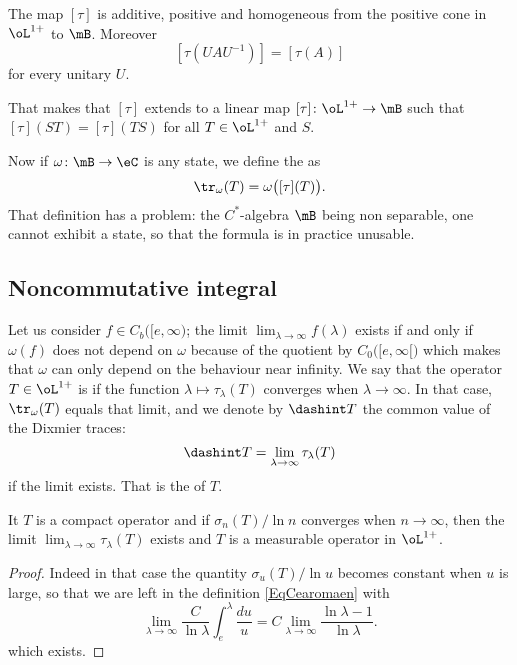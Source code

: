 \begin{proposition}
	The map $[\tau]$ is additive, positive and homogeneous from the positive cone in $\oL^{1+}$ to $\mB$. Moreover
	\[
		[\tau(UAU^{-1})]=[\tau(A)]
	\]
	for every unitary $U$.
\end{proposition}
That makes that $[\tau]$ extends to a linear map $[\tau]\colon \oL^{1+}\to \mB$ such that $[\tau](ST)=[\tau](TS)$ for all $T\in\oL^{1+}$ and $S$.

Now if $\omega\colon \mB\to \eC$ is any state, we define the  as
\begin{equation}
	\tr_{\omega}(T)=\omega\big( [\tau](T) \big).
\end{equation}
That definition has a problem: the $C^*$-algebra $\mB$ being non separable, one cannot exhibit a state, so that the formula is in practice unusable.

\subsection{Noncommutative integral}

Let us consider $f\in C_b\big( [e,\infty \big)$; the limit $\lim_{\lambda\to\infty}f(\lambda)$ exists if and only if $\omega(f)$ does not depend on $\omega$ because of the quotient by $C_0\big( [e,\infty[ \big)$ which makes that $\omega$ can only depend on the behaviour near infinity. We say that the operator $T\in\oL^{1+}$ is  if the function $\lambda\mapsto\tau_{\lambda}(T)$ converges when $\lambda\to\infty$. In that case, $\tr_{\omega}(T)$ equals that limit, and we denote by $\dashint T$ the common value of the Dixmier traces:
\begin{equation}
	\dashint T=\lim_{\lambda\to\infty}\tau_{\lambda}(T)
\end{equation}
if the limit exists. That is the  of $T$.

\begin{proposition}
	It $T$ is a compact operator and if $\sigma_n(T)/\ln n$ converges when $n\to\infty$, then the limit $\lim_{\lambda\to\infty}\tau_{\lambda}(T)$ exists and $T$ is a measurable operator in $\oL^{1+}$.
\end{proposition}

\begin{proof}
	Indeed in that case the quantity $\sigma_u(T)/\ln u$ becomes constant when $u$ is large, so that we are left in the definition \eqref{EqCearomaen} with
	\[
		\lim_{\lambda\to\infty}\frac{C}{ \ln\lambda }\int_e^{\lambda}\frac{ du }{ u }=C\lim_{\lambda\to\infty}\frac{ \ln\lambda-1 }{ \ln\lambda }.
	\]
	which exists.
\end{proof}


